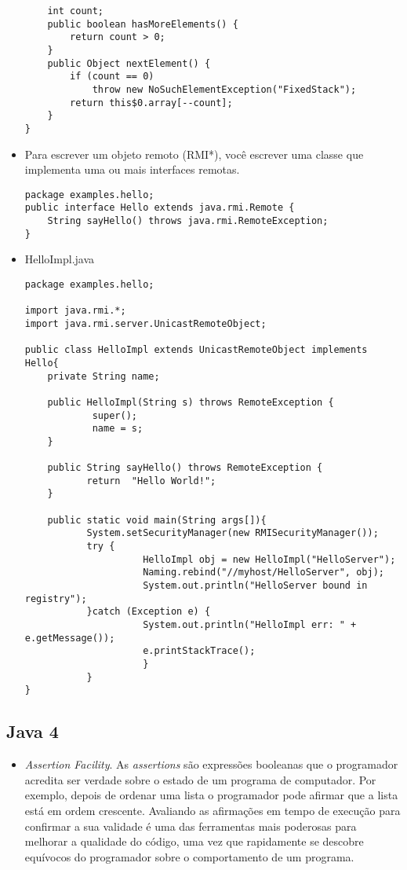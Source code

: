 \begin{itemize}
\begin{lstlisting}
    int count;
    public boolean hasMoreElements() {
        return count > 0;
    }
    public Object nextElement() {
        if (count == 0)
            throw new NoSuchElementException("FixedStack");
        return this$0.array[--count];
    }
}\end{lstlisting}

  \item Para escrever um objeto remoto (RMI*), você escrever uma classe que implementa uma ou mais interfaces remotas. 
  
\begin{lstlisting}
package examples.hello;
public interface Hello extends java.rmi.Remote {
    String sayHello() throws java.rmi.RemoteException;
}
\end{lstlisting}
  
  \item HelloImpl.java
  \begin{lstlisting}
package examples.hello;

import java.rmi.*;
import java.rmi.server.UnicastRemoteObject;

public class HelloImpl extends UnicastRemoteObject implements Hello{
    private String name;

    public HelloImpl(String s) throws RemoteException {
            super();
            name = s;
	}

    public String sayHello() throws RemoteException {
           return  "Hello World!";
	}
	
    public static void main(String args[]){
           System.setSecurityManager(new RMISecurityManager());
           try {
                     HelloImpl obj = new HelloImpl("HelloServer");
                     Naming.rebind("//myhost/HelloServer", obj);
                     System.out.println("HelloServer bound in registry");
           }catch (Exception e) {
                     System.out.println("HelloImpl err: " + e.getMessage());
                     e.printStackTrace();
                     }
           }
}

  \end{lstlisting}
  \end{itemize}
  
\subsection {Java 4}
  \begin{itemize}
	  \item {\it Assertion Facility}. As {\it assertions} são expressões booleanas que o programador acredita ser verdade sobre o estado de um programa de computador. Por exemplo, depois de ordenar uma lista o programador pode afirmar que a lista está em ordem crescente. Avaliando as afirmações em tempo de execução para confirmar a sua validade é uma das ferramentas mais poderosas para melhorar a qualidade do código, uma vez que rapidamente se descobre equívocos do programador sobre o comportamento de um programa.
  \end{itemize}
  
